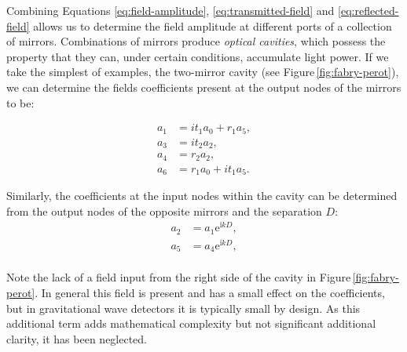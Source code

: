 Combining Equations \ref{eq:field-amplitude}, \ref{eq:transmitted-field} and \ref{eq:reflected-field} allows us to determine the field amplitude at different ports of a collection of mirrors. Combinations of mirrors produce \emph{optical cavities}, which possess the property that they can, under certain conditions, accumulate light power. If we take the simplest of examples, the two-mirror \FP{} cavity (see Figure\,\ref{fig:fabry-perot}), we can determine the fields coefficients present at the output nodes of the mirrors to be:

\begin{equation}
  \label{eq:fabry-perot-coefficients-1}
  \begin{split}
    a_1 &= it_1 a_0 + r_1 a_5, \\
    a_3 &= it_2 a_2, \\
    a_4 &= r_2 a_2, \\
    a_6 &= r_1 a_0 + it_1 a_5.
  \end{split}
\end{equation}

Similarly, the coefficients at the input nodes within the cavity can be determined from the output nodes of the opposite mirrors and the separation $D$:
\begin{equation}
  \label{eq:fabry-perot-coefficients-2}
  \begin{split}
    a_2 &= a_1 \text{e}^{\text{i} kD}, \\
    a_5 &= a_4 \text{e}^{\text{i} kD}, \\
  \end{split}
\end{equation}

Note the lack of a field input from the right side of the cavity in Figure\,\ref{fig:fabry-perot}. In general this field is present and has a small effect on the coefficients, but in gravitational wave detectors it is typically small by design. As this additional term adds mathematical complexity but not significant additional clarity, it has been neglected.

